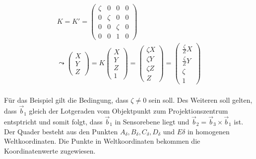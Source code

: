 \begin{gather}
	K=K'
	= 
	\begin{pmatrix}
		\zeta&0&0&0\\
		0&\zeta&0&0\\
		0&0&\zeta&0\\
		0&0&1&0
	\end{pmatrix}\\
	\leadsto
	\begin{pmatrix}
		X\\Y\\Z
	\end{pmatrix} = 
	K
	\begin{pmatrix}
		X\\Y\\Z\\1
	\end{pmatrix}
	=
	\begin{pmatrix}
		\zeta X\\\zeta Y\\\zeta Z\\Z
	\end{pmatrix}
	=
	\begin{pmatrix}
		\frac{\zeta}{Z} X\\\frac{\zeta}{Z} Y\\\zeta\\1
	\end{pmatrix}
\end{gather}\\

Für das Beispiel gilt die Bedingung, dass $\zeta \neq 0$ sein soll. Des Weiteren soll gelten, dass  \ensuremath{\vec{b}_1} gleich der Lotgeraden vom Objektpunkt zum Projektionszentrum entsptricht und somit folgt, dass \ensuremath{\vec{b}_1} in Sensorebene liegt und \ensuremath{\vec{b}_2 = \vec{b}_3 \times \vec{b}_1} ist. Der Quader besteht aus den Punkten $A_\delta,B_\delta,C_\delta, D_\delta$ und $E\delta$ in homogenen Weltkoordinaten. Die Punkte in Weltkoordinaten bekommen die Koordinatenwerte zugewiesen. 

